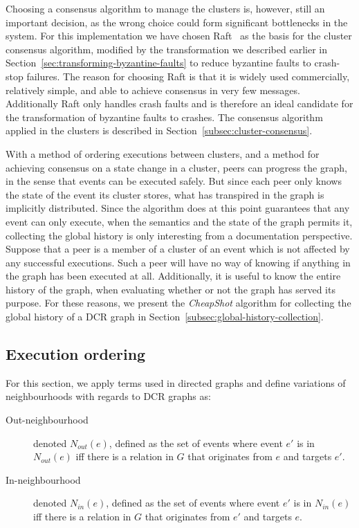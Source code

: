 \documentclass{article}
\begin{document}
	Choosing a consensus algorithm to manage the clusters is, however, still an important decision, as the wrong choice could form significant bottlenecks in the system.
	For this implementation we have chosen Raft~\cite{ongaro_search_2014} as the basis for the cluster consensus algorithm, modified by the transformation we described earlier in Section~\ref{sec:transforming-byzantine-faults} to reduce byzantine faults to crash-stop failures.
	The reason for choosing Raft is that it is widely used commercially, relatively simple, and able to achieve consensus in very few messages.
	Additionally Raft only handles crash faults and is therefore an ideal candidate for the transformation of byzantine faults to crashes.
	The consensus algorithm applied in the clusters is described in Section~\ref{subsec:cluster-consensus}.

	With a method of ordering executions between clusters, and a method for achieving consensus on a state change in a cluster, peers can progress the graph, in the sense that events can be executed safely.
	But since each peer only knows the state of the event its cluster stores, what has transpired in the graph is implicitly distributed.
	Since the algorithm does at this point guarantees that any event can only execute, when the semantics and the state of the graph permits it, collecting the global history is only interesting from a documentation perspective.
	Suppose that a peer is a member of a cluster of an event which is not affected by any successful executions. Such a peer will have no way of knowing if anything in the graph has been executed at all.
	Additionally, it is useful to know the entire history of the graph, when evaluating whether or not the graph has served its purpose.
	For these reasons, we present the \textit{CheapShot} algorithm for collecting the global history of a DCR graph in Section~\ref{subsec:global-history-collection}.

	\subsection{Execution ordering}
	\label{subsec:execution-ordering}

	For this section, we apply terms used in directed graphs and define variations of neighbourhoods with regards to DCR graphs as:
	\begin{description}
		\item[Out-neighbourhood] denoted $N_{out}(e)$, defined as the set of events where event $e'$ is in $N_{out}(e)$ iff there is a relation in $G$ that originates from $e$ and targets $e'$.
		\item[In-neighbourhood] denoted $N_{in}(e)$, defined as the set of events where event $e'$ is in $N_{in}(e)$ iff there is a relation in $G$ that originates from $e'$ and targets $e$.
	\end{description}
\end{document}
